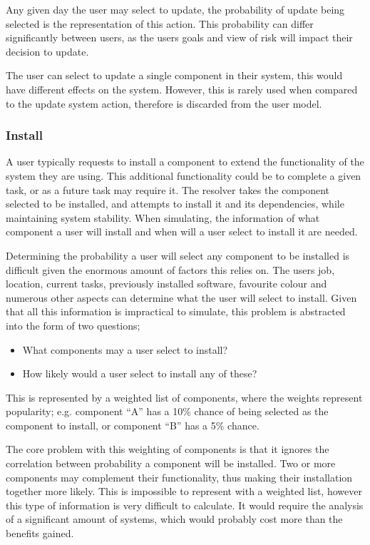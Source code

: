 Any given day the user may select to update, the probability of update being selected is the representation of this action.
This probability can differ significantly between users,  
as the users goals and view of risk will impact their decision to update.

The user can select to update a single component in their system, this would have different effects on the system.
However, this is rarely used when compared to the update system action, therefore is discarded from the user model.

\subsubsection{Install}
A user typically requests to install a component to extend the functionality of the system they are using.
This additional functionality could be to complete a given task, or as a future task may require it. 
The resolver takes the component selected to be installed, and attempts to install it and its dependencies, while maintaining system stability.
When simulating, the information of what component a user will install and when will a user select to install it are needed. 

Determining the probability a user will select any component to be installed is difficult given the enormous amount of factors this relies on.
The users job, location, current tasks, previously installed software, favourite colour and numerous other aspects can determine what the user will select to install.
Given that all this information is impractical to simulate, this problem is abstracted into the form of two questions;
\begin{itemize}
  \item What components may a user select to install?
  \item How likely would a user select to install any of these?
\end{itemize}
This is represented by a weighted list of components, where the weights represent popularity;
e.g. component ``A'' has a 10\% chance of being selected as the component to install, or component ``B'' has a 5\% chance.

The core problem with this weighting of components is that it ignores the correlation between probability a component will be installed. 
Two or more components may complement their functionality, thus making their installation together more likely.
This is impossible to represent with a weighted list, however this type of information is very difficult to calculate.
It would require the analysis of a significant amount of systems, which would probably cost more than the benefits gained.

